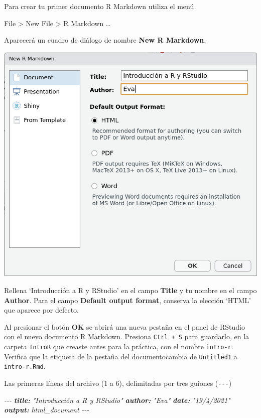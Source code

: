 \documentclass[
  degree=mecinf,
  title=normal,
  toc=normal,
  bib=normal]{mnye}
\newenvironment{menu}{
    \begin{center}
    \sffamily\bfseries
}{
    \end{center}
}
\newenvironment{Shaded}{\begin{snugshade}}{\end{snugshade}}
\newcommand{\AnnotationTok}[1]{\textcolor[rgb]{0.56,0.35,0.01}{\textbf{\textit{#1}}}}
\newcommand{\CommentTok}[1]{\textcolor[rgb]{0.56,0.35,0.01}{\textit{#1}}}
\begin{document}
Para crear tu primer documento R Markdown utiliza el menú

\begin{menu}
File \textgreater{} New File \textgreater{} R Markdown \ldots{}

\end{menu}

Aparecerá un cuadro de diálogo de nombre \textbf{New R Markdown}.

\begin{center}\includegraphics[width=1\linewidth]{images/new-r-markdown} \end{center}

Rellena `Introducción a R y RStudio' en el campo \textbf{Title} y tu nombre en el campo \textbf{Author}. Para el campo \textbf{Default output format}, conserva la elección `HTML' que aparece por defecto.

Al presionar el botón \textbf{OK} se abrirá una nueva pestaña en el panel de \textsf{RStudio} con el nuevo documento R Markdown. Presiona \texttt{Ctrl\ +\ S} para guardarlo, en la carpeta \texttt{IntroR} que creaste antes para la práctica, con el nombre \texttt{intro-r}. Verifica que la etiqueta de la pestaña del documentocambia de \texttt{Untitled1} a \texttt{intro-r.Rmd}.

Las primeras líneas del archivo (1 a 6), delimitadas por tres guiones (\texttt{-\/-\/-})

\begin{Shaded}
\begin{Highlighting}[]
\CommentTok{{-}{-}{-}}
\AnnotationTok{title:}\CommentTok{ "Introducción a R y RStudio"}
\AnnotationTok{author:}\CommentTok{ "Eva"}
\AnnotationTok{date:}\CommentTok{ "19/4/2021"}
\AnnotationTok{output:}\CommentTok{ html\_document}
\CommentTok{{-}{-}{-}}
\end{Highlighting}
\end{Shaded}
\end{document}
